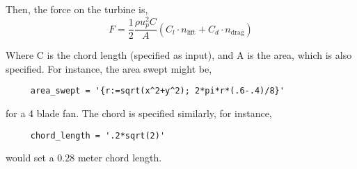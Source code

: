 \documentclass{article}
\begin{document}
Then, the force on the turbine is, 
\begin{equation}
 \boxed{F = \frac{1}{2}\frac{\rho u_p^2 C}{A}\left(C_l \cdot
					      n_\text{lift} + C_d \cdot n_\text{drag}  \right)}
\end{equation}

Where C is the chord length (specified as input), and A is the area,
which is also specified. For instance, the area swept might be, 
\begin{lstlisting}
     area_swept = '{r:=sqrt(x^2+y^2); 2*pi*r*(.6-.4)/8}'
\end{lstlisting}
for a 4 blade fan. The chord is specified similarly, for instance, 
\begin{lstlisting}
     chord_length = '.2*sqrt(2)'
\end{lstlisting}
would set a 0.28 meter chord length. 
%




\end{document}
